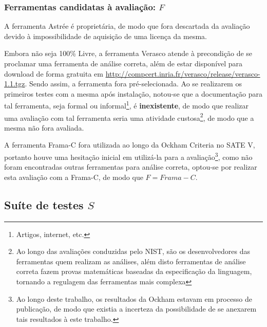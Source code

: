 \subsubsection{Ferramentas candidatas à avaliação: $F$}

A ferramenta Astrée é proprietária, de modo que fora descartada da avaliação devido à impossibilidade de aquisição de uma licença da mesma.

Embora não seja 100\% Livre, a ferramenta Verasco atende à precondição de se proclamar uma ferramenta de análise correta, além de estar disponível para download de forma gratuita em \url{http://compcert.inria.fr/verasco/release/verasco-1.1.tgz}. Sendo assim, a ferramenta fora pré-selecionada. Ao se realizarem os primeiros testes com a mesma após instalação, notou-se que a documentação para tal ferramenta, seja formal ou informal\footnote{Artigos, internet, etc.}, é \textbf{inexistente}, de modo que realizar uma avaliação com tal ferramenta seria uma atividade custosa\footnote{Ao longo das avaliações conduzidas pelo NIST, são os desenvolvedores das ferramentas quem realizam as análises, além disto ferramentas de análise correta fazem provas matemáticas baseadas da especificação da linguagem, tornando a regulagem das ferramentas mais complexa}, de modo que a mesma não fora avaliada.

A ferramenta Frama-C fora utilizada ao longo da Ockham Criteria no SATE V, portanto houve uma hesitação inicial em utilizá-la para a avaliação\footnote{Ao longo deste trabalho, os resultados da Ockham estavam em processo de publicação, de modo que existia a incerteza da possibilidade de se anexarem tais resultados à este trabalho.}, como não foram encontradas outras ferramentas para análise correta, optou-se por realizar esta avaliação com a Frama-C, de modo que
$F = {Frama-C}$.

\subsection{Suíte de testes $S$}

